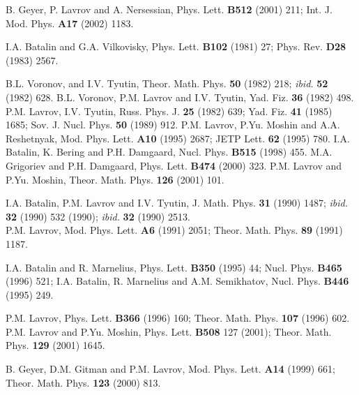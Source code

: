 \documentclass[a4paper,11pt]{article}
\begin{document}
\begin{thebibliography}{99}
  B. Geyer, P. Lavrov and A. Nersessian, Phys. Lett.
\textbf{B512} (2001) 211; Int. J. Mod. Phys. \textbf{A17} (2002) 1183.

  I.A. Batalin and G.A. Vilkovisky, Phys. Lett. \textbf{%
B102} (1981) 27; Phys. Rev. \textbf{D28} (1983) 2567.

  B.L. Voronov, and I.V. Tyutin, Theor. Math. Phys. %
\textbf{50} (1982) 218; \textit{ibid.} \textbf{52} (1982) 628. B.L.
Voronov, P.M. Lavrov and I.V. Tyutin, Yad. Fiz. \textbf{36} (1982) 498.
\newline
P.M. Lavrov, I.V. Tyutin, Russ. Phys. J. \textbf{25} (1982) 639;
Yad. Fiz. \textbf{41} (1985) 1685; Sov. J. Nucl. Phys.
\textbf{50} (1989) 912.\newline
P.M. Lavrov, P.Yu. Moshin and A.A. Reshetnyak, Mod. Phys. Lett.
\textbf{A10} (1995) 2687; JETP Lett. \textbf{62} (1995) 780.%
\newline
I.A. Batalin, K. Bering and P.H. Damgaard, Nucl. Phys. \textbf{B515} 
(1998) 455.\newline
M.A. Grigoriev and P.H. Damgaard, Phys. Lett. \textbf{B474} (2000) 323.
\newline
P.M. Lavrov and P.Yu. Moshin, Theor. Math. Phys. \textbf{126} (2001) 101.


  I.A. Batalin, P.M. Lavrov and I.V. Tyutin, J. Math. Phys.
\textbf{31} (1990) 1487; \textit{ibid.} \textbf{32} (1990) 532 (1990); 
\textit{ibid.} \textbf{32} (1990) 2513.\\
P.M. Lavrov, Mod. Phys. Lett. \textbf{A6} (1991) 2051; Theor. Math.
Phys. \textbf{89} (1991) 1187.

  I.A. Batalin and R. Marnelius, Phys. Lett. \textbf{%
B350} (1995) 44; Nucl. Phys. \textbf{B465} (1996) 521;\newline
I.A. Batalin, R. Marnelius and A.M. Semikhatov, Nucl. Phys. \textbf{%
B446} (1995) 249.

  P.M. Lavrov, Phys. Lett. \textbf{B366} (1996) 160;
Theor. Math. Phys. \textbf{107} (1996) 602.\newline
P.M. Lavrov and P.Yu. Moshin, Phys. Lett. \textbf{B508} 127 (2001); 
Theor. Math. Phys. \textbf{129} (2001) 1645.

  B. Geyer, D.M. Gitman and P.M. Lavrov, Mod. Phys.
Lett. \textbf{A14} (1999) 661; Theor. Math. Phys. \textbf{123}
(2000) 813.


\end{thebibliography}
\end{document}
